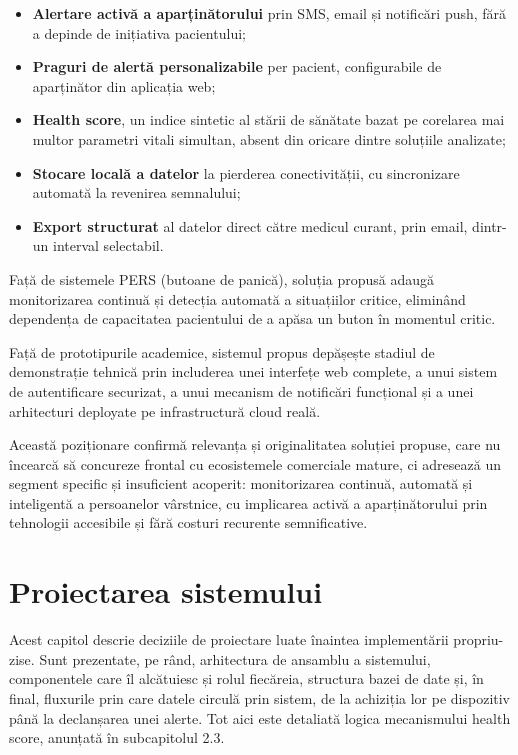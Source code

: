 \documentclass[12pt,a4paper,twoside]{article}
\begin{document}
\begin{itemize}[leftmargin=1.5em]
\item \textbf{Alertare activă a aparținătorului} prin SMS, email și notificări push, fără a depinde de inițiativa pacientului;
\item \textbf{Praguri de alertă personalizabile} per pacient, configurabile de aparținător din aplicația web;
\item \textbf{Health score}, un indice sintetic al stării de sănătate bazat pe corelarea mai multor parametri vitali simultan, absent din oricare dintre soluțiile analizate;
\item \textbf{Stocare locală a datelor} la pierderea conectivității, cu sincronizare automată la revenirea semnalului;
\item \textbf{Export structurat} al datelor direct către medicul curant, prin email, dintr-un interval selectabil.
\end{itemize}

Față de sistemele PERS (butoane de panică), soluția propusă adaugă monitorizarea continuă și detecția automată a situațiilor critice, eliminând dependența de capacitatea pacientului de a apăsa un buton în momentul critic.

Față de prototipurile academice, sistemul propus depășește stadiul de demonstrație tehnică prin includerea unei interfețe web complete, a unui sistem de autentificare securizat, a unui mecanism de notificări funcțional și a unei arhitecturi deployate pe infrastructură cloud reală.

Această poziționare confirmă relevanța și originalitatea soluției propuse, care nu încearcă să concureze frontal cu ecosistemele comerciale mature, ci adresează un segment specific și insuficient acoperit: monitorizarea continuă, automată și inteligentă a persoanelor vârstnice, cu implicarea activă a aparținătorului prin tehnologii accesibile și fără costuri recurente semnificative.

\newpage
\section{Proiectarea sistemului}

Acest capitol descrie deciziile de proiectare luate înaintea implementării propriu-zise. Sunt prezentate, pe rând, arhitectura de ansamblu a sistemului, componentele care îl alcătuiesc și rolul fiecăreia, structura bazei de date și, în final, fluxurile prin care datele circulă prin sistem, de la achiziția lor pe dispozitiv până la declanșarea unei alerte. Tot aici este detaliată logica mecanismului health score, anunțată în subcapitolul 2.3.
\end{document}
